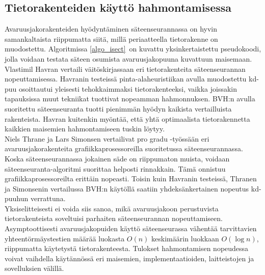 ﻿\documentclass[a4paper, 12pt, titlepage]{article}
\begin{document}


\subsection{Tietorakenteiden käyttö hahmontamisessa}

Avaruusjakorakenteiden hyödyntäminen säteenseurannassa on hyvin samankaltaista riippumatta siitä, millä periaatteella tietorakenne on muodostettu. Algoritmissa \ref{algo_isect} on kuvattu yksinkertaistettu pseudokoodi, jolla voidaan testata säteen osumista avaruusjakopuuna kuvattuun maisemaan.\\ 



Vlastimil Havran vertaili väitöskirjassaan eri tietorakenteita säteenseurannan nopeuttamisessa. Havranin testeissä pinta-alaheuristiikan avulla muodostettu kd-puu osoittautui yleisesti tehokkaimmaksi tietorakenteeksi, vaikka joissakin tapauksissa muut tekniikat tuottivat nopeamman hahmonnuksen. BVH:n avulla suoritettu säteenseuranta tuotti pienimmän hyödyn kaikista vertailluista rakenteista. Havran kuitenkin myöntää, että yhtä optimaalista tietorakennetta kaikkien maisemien hahmontamiseen tuskin löytyy. \citep[.]{havran}\\

Niels Thrane ja Lars Simonsen vertailivat pro gradu -työssään eri avaruusjakorakenteita grafiikkaprosessoreilla suoritetussa säteenseurannassa. Koska säteenseurannassa jokainen säde on riippumaton muista, voidaan säteenseuranta-algoritmi suorittaa helposti rinnakkain. Tämä onnistuu grafiikkaprosessoreilta erittäin nopeasti. Toisin kuin Havranin testeissä, Thranen ja Simonsenin vertailussa BVH:n käytöllä saatiin yhdeksänkertainen nopeutus kd-puuhun verrattuna. \citep[.]{thrane}\\  

Yksiselitteisesti ei voida siis sanoa, mikä avaruusjakoon perustuvista tietorakenteista soveltuisi parhaiten säteenseurannan nopeuttamiseen. Asymptoottisesti avaruusjakopuiden käyttö säteenseurassa vähentää tarvittavien yhteentörmäystestien määrää luokasta $O(n)$ keskimäärin luokkaan $O(\log n)$, riippumatta käytetystä tietorakenteesta. Tulokset hahmontamisen nopeudessa voivat vaihdella käytännössä eri maisemien, implementaatioiden, laitteistojen ja sovelluksien välillä. \citep[.]{wald04} \\
\end{document}
